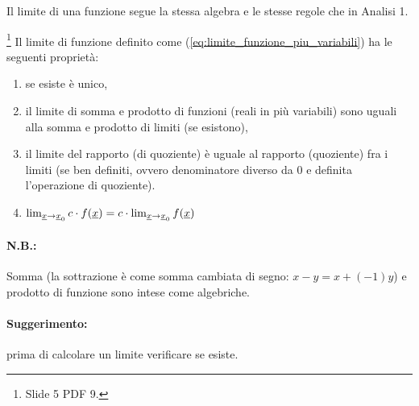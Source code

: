 Il limite di una funzione segue la stessa algebra e le stesse regole che in Analisi 1.
\begin{property}\footnote{Slide 5 PDF 9.}
    Il limite di funzione definito come (\ref{eq:limite_funzione_piu_variabili}) ha le seguenti proprietà:
    \begin{enumerate}
        \item se esiste è unico,
        \item il limite di somma e prodotto di funzioni (reali in più variabili) sono uguali alla somma e prodotto di limiti (se esistono),
        \item il limite del rapporto (di quoziente) è uguale al rapporto (quoziente) fra i limiti (se ben definiti, ovvero denominatore diverso da 0 e definita l'operazione di quoziente).
        \item $\lim_{\uline x\rightarrow\uline x_0}c\cdot f(\uline x)=c\cdot\lim_{\uline x\rightarrow \uline x_0}f(\uline x)$
    \end{enumerate}
\end{property}

\paragraph{N.B.:} Somma (la sottrazione è come somma cambiata di segno: $x-y=x+(-1) y$) e prodotto di funzione sono intese come algebriche.

\paragraph{Suggerimento:} prima di calcolare un limite verificare se esiste.

